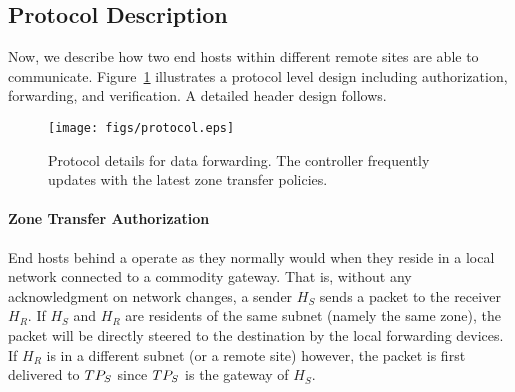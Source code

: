 


\subsection{Protocol Description}
\label{ssec:protocol}

Now, we describe how two end hosts within different remote sites are able to communicate. 
Figure~\ref{fig:protocol} illustrates a protocol level design including authorization,
forwarding, and verification. A detailed header design follows.

\begin{figure}[t]
\begin{center}
\texttt{[image: figs/protocol.eps]}
\end{center}
\caption{Protocol details for data forwarding. The controller frequently updates \tps 
with the latest zone transfer policies.}
\label{fig:protocol}
\end{figure}


\paragraph{Zone Transfer Authorization}
End hosts behind a \tp operate as they normally would when they reside in a local network connected to a commodity gateway. That is, without any acknowledgment on network changes, a sender $H_S$ 
sends a packet to the receiver $H_R$. If $H_S$ and $H_R$ are residents of the same subnet 
(namely the same zone), the packet will be directly steered to the destination by the local 
forwarding devices. If $H_R$ is in a different subnet (or a remote site) however, the packet
is first delivered to $TP_S$ since $TP_S$ is the gateway of $H_S$. %

